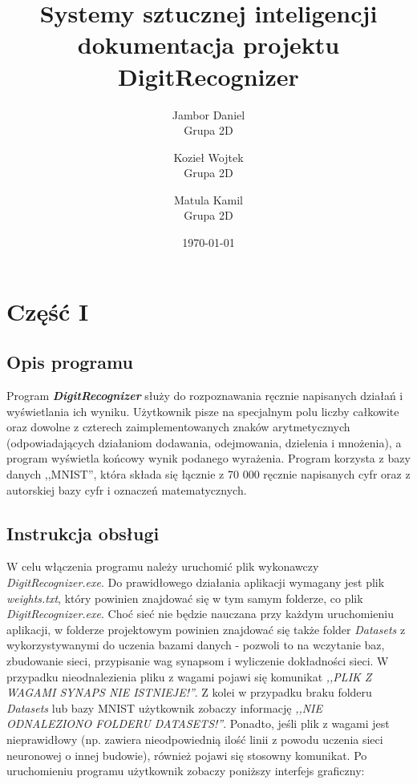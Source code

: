 \documentclass[12pt,a4paper]{article}
\begin{document}
	
	\title{Systemy sztucznej inteligencji\\\small{dokumentacja projektu DigitRecognizer}}
	\author{
	Jambor Daniel\\
	Grupa 2D
	\and
	Kozieł Wojtek\\
	Grupa 2D
	\and
	Matula Kamil\\
	Grupa 2D}

	\date{\today}

	\maketitle
	\newpage
	\section*{Część I}
	\subsection*{Opis programu}
\hspace{20pt}Program \textit{\textbf{DigitRecognizer}} służy do rozpoznawania ręcznie napisanych działań i wyświetlania ich wyniku. Użytkownik pisze na specjalnym polu liczby całkowite oraz dowolne z czterech zaimplementowanych znaków arytmetycznych (odpowiadających działaniom dodawania, odejmowania, dzielenia i mnożenia), a program wyświetla końcowy wynik podanego wyrażenia. Program korzysta z bazy danych ,,MNIST'', która składa się łącznie z 70 000 ręcznie napisanych cyfr oraz z autorskiej bazy cyfr i oznaczeń matematycznych.	
\vspace{20pt}	
	
	\subsection*{Instrukcja obsługi}
\hspace{20pt}W celu włączenia programu należy uruchomić plik wykonawczy \textit{DigitRecognizer.exe}. Do prawidłowego działania aplikacji wymagany jest plik \textit{weights.txt}, który powinien znajdować się w tym samym folderze, co plik \textit{DigitRecognizer.exe}. Choć sieć nie będzie nauczana przy każdym uruchomieniu aplikacji, w folderze projektowym powinien znajdować się także folder \textit{Datasets} z wykorzystywanymi do uczenia bazami danych - pozwoli to na wczytanie baz, zbudowanie sieci, przypisanie wag synapsom i wyliczenie dokładności sieci. W przypadku nieodnalezienia pliku z wagami pojawi się komunikat \textit{,,PLIK Z WAGAMI SYNAPS NIE ISTNIEJE!''}. Z kolei w przypadku braku folderu \textit{Datasets} lub bazy MNIST użytkownik zobaczy informację \textit{,,NIE ODNALEZIONO FOLDERU DATASETS!''}. Ponadto, jeśli plik z wagami jest nieprawidłowy (np. zawiera nieodpowiednią ilość linii z powodu uczenia sieci neuronowej o innej budowie), również pojawi się stosowny komunikat. Po uruchomieniu programu użytkownik zobaczy poniższy interfejs graficzny:
\end{document}
